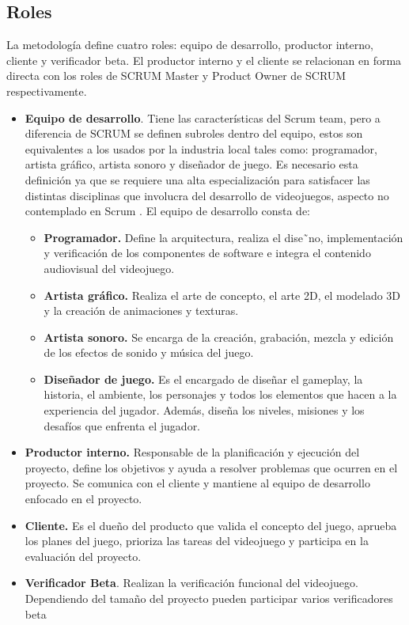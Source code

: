 \documentclass[a4paper, openright, 12pt]{report}
\begin{document}
\subsection*{Roles}
\justify
La metodología define cuatro roles: equipo de desarrollo, productor interno, cliente y verificador beta. El productor interno y el cliente se relacionan en forma directa con los roles de SCRUM Master y Product Owner de SCRUM respectivamente.\\
\begin{itemize}
\item \textbf{Equipo de desarrollo}. Tiene las características del Scrum team, pero a
diferencia de SCRUM se definen subroles dentro del equipo, estos son equivalentes
a los usados por la industria local tales como: programador, artista gráfico,
artista sonoro y diseñador de juego. Es necesario esta definición ya que se requiere una alta especialización para satisfacer las distintas disciplinas que involucra del desarrollo de videojuegos, aspecto no contemplado en Scrum \cite{Acerenza2009}. El equipo de desarrollo consta de:
\begin{itemize}
\item \textbf{Programador.} Define la arquitectura, realiza el dise˜no, implementación y verificación de los componentes de software e integra el contenido audiovisual del videojuego. \cite{Acerenza2009}
\item \textbf{Artista gráfico.} Realiza el
arte de concepto, el arte 2D, el modelado 3D y la creación de animaciones y
texturas. \cite{Acerenza2009}
\item \textbf{Artista sonoro.} Se encarga de la creación, grabación, mezcla y edición de los efectos de sonido y música del juego. \cite{Acerenza2009}
\item \textbf{Diseñador de juego.} Es el encargado de diseñar el gameplay, la historia, el ambiente, los personajes y todos los elementos que hacen a la experiencia del jugador. Además, diseña los niveles, misiones y los desafíos que enfrenta el jugador. \cite{Acerenza2009}
\end{itemize}
\item \textbf{Productor interno.} Responsable de la planificación y ejecución del proyecto, define los objetivos y ayuda a resolver problemas que ocurren en el proyecto. Se comunica con el cliente y mantiene al equipo de desarrollo enfocado en el proyecto. \cite{Acerenza2009}
\item \textbf{Cliente.} Es el dueño del producto que valida el concepto del juego, aprueba los planes del juego, prioriza las tareas del videojuego y participa en la evaluación del proyecto. \cite{Acerenza2009} 
\item \textbf{Verificador Beta}. Realizan la verificación funcional del videojuego. Dependiendo del tamaño del proyecto pueden participar varios verificadores beta \cite{Acerenza2009} 
\end{itemize}
\end{document}
